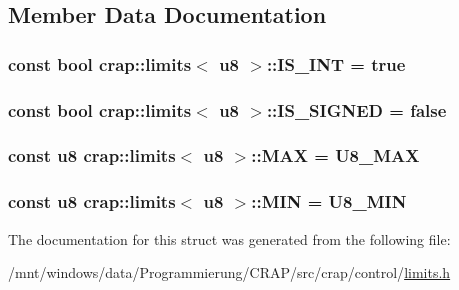 \subsection{Member Data Documentation}
\hypertarget{structcrap_1_1limits_3_01u8_01_4_a052fb6c41ae0f2fa6224b8bae28b9a89}{
\subsubsection[{I\-S\-\_\-\-I\-N\-T}]{\setlength{\rightskip}{0pt plus 5cm}const bool {\bf crap\-::limits}$<$ {\bf u8} $>$\-::I\-S\-\_\-\-I\-N\-T = true\hspace{0.3cm}{\ttfamily [static]}}}\label{structcrap_1_1limits_3_01u8_01_4_a052fb6c41ae0f2fa6224b8bae28b9a89}
\hypertarget{structcrap_1_1limits_3_01u8_01_4_a13b8efd8c3d5fb1b35f62f656a52cb38}{
\subsubsection[{I\-S\-\_\-\-S\-I\-G\-N\-E\-D}]{\setlength{\rightskip}{0pt plus 5cm}const bool {\bf crap\-::limits}$<$ {\bf u8} $>$\-::I\-S\-\_\-\-S\-I\-G\-N\-E\-D = false\hspace{0.3cm}{\ttfamily [static]}}}\label{structcrap_1_1limits_3_01u8_01_4_a13b8efd8c3d5fb1b35f62f656a52cb38}
\hypertarget{structcrap_1_1limits_3_01u8_01_4_a0a25361a83b792daacb9fb54c2c1f2a2}{
\subsubsection[{M\-A\-X}]{\setlength{\rightskip}{0pt plus 5cm}const {\bf u8} {\bf crap\-::limits}$<$ {\bf u8} $>$\-::M\-A\-X = {\bf U8\-\_\-\-M\-A\-X}\hspace{0.3cm}{\ttfamily [static]}}}\label{structcrap_1_1limits_3_01u8_01_4_a0a25361a83b792daacb9fb54c2c1f2a2}
\hypertarget{structcrap_1_1limits_3_01u8_01_4_a4a124feb65fbc522810c3e9c2fbb29ae}{
\subsubsection[{M\-I\-N}]{\setlength{\rightskip}{0pt plus 5cm}const {\bf u8} {\bf crap\-::limits}$<$ {\bf u8} $>$\-::M\-I\-N = {\bf U8\-\_\-\-M\-I\-N}\hspace{0.3cm}{\ttfamily [static]}}}\label{structcrap_1_1limits_3_01u8_01_4_a4a124feb65fbc522810c3e9c2fbb29ae}


The documentation for this struct was generated from the following file\-:\begin{DoxyCompactItemize}
\item 
/mnt/windows/data/\-Programmierung/\-C\-R\-A\-P/src/crap/control/\hyperlink{limits_8h}{limits.\-h}\end{DoxyCompactItemize}
